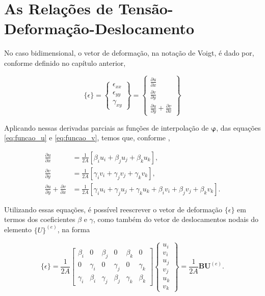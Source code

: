 \section{As Relações de Tensão-Deformação-Deslocamento}

No caso bidimensional, o vetor de deformação, na notação de Voigt, é dado por, conforme definido no capítulo anterior,

\begin{equation}
    \{\epsilon\} = \begin{Bmatrix}
        \epsilon_{xx} \\ \epsilon_{yy} \\ \gamma_{xy}
    \end{Bmatrix} =
    \begin{Bmatrix}
        \frac{\partial u}{\partial x} \\ \frac{\partial v}{\partial y} \\ \frac{\partial u}{\partial y} + \frac{\partial v}{\partial x}
    \end{Bmatrix}
\end{equation}

Aplicando nessas derivadas parciais as funções de interpolação de $\bm{\varphi}$, das equações \ref{eq:funcao_u} e \ref{eq:funcao_v}, temos que, conforme ,

\begin{align}
    \frac{\partial u}{\partial x} &= \frac{1}{2A} \left[ \beta_i u_i + \beta_j u_j + \beta_k u_k\right],  \\
    \frac{\partial v}{\partial y} &= \frac{1}{2A} \left[ \gamma_i v_i + \gamma_j v_j + \gamma_k v_k\right],  \\
    \frac{\partial u}{\partial y} + \frac{\partial v}{\partial x} &= \frac{1}{2A} \left[ \gamma_i u_i + \gamma_j u_j + \gamma_k u_k + \beta_i v_i + \beta_j v_j + \beta_k v_k \right].
\end{align}

Utilizando essas equações, é possível reescrever o vetor de deformação $\{\epsilon\}$ em termos dos coeficientes $\beta$ e $\gamma$, como também do vetor de deslocamentos nodais do elemento $\{U\}^{(e)}$, na forma

\begin{equation}
    \{\epsilon\} = \frac{1}{2A} \begin{bmatrix}
        \beta_i & 0 & \beta_j & 0 & \beta_k & 0 \\
        0 & \gamma_i & 0 & \gamma_j & 0 & \gamma_k \\
        \gamma_i & \beta_i & \gamma_j & \beta_j & \gamma_k & \beta_k
    \end{bmatrix} \begin{Bmatrix}
        u_i \\ v_i \\ u_j \\ v_j \\ u_k \\ v_k
    \end{Bmatrix} = \frac{1}{2A} \bm{B} \bm{U}^{(e)}.
    \label{eq:deformacao_deslocamento}
\end{equation}

